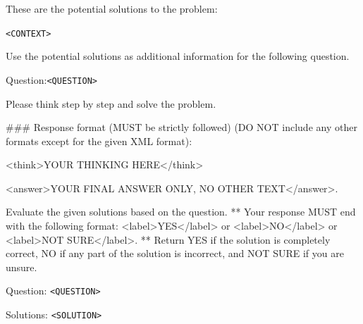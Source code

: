 \documentclass{article} %
\theoremstyle{plain}
\begin{document}


\begin{tcolorbox}[breakable,
  colback=gray!20!white,
  colframe=gray!80!black,
  title=Debate Prompt,
  fonttitle=\bfseries
]
These are the potential solutions to the problem:

\texttt{<CONTEXT>}

Use the potential solutions as additional information for the following question.

Question:\texttt{<QUESTION>}

Please think step by step and solve the problem.

\#\#\# Response format (MUST be strictly followed) (DO NOT include any other formats except for the given XML format): 

<think>YOUR THINKING HERE</think>

<answer>YOUR FINAL ANSWER ONLY, NO OTHER TEXT</answer>.
\end{tcolorbox}

\begin{tcolorbox}[breakable, 
  colback=gray!20!white,
  colframe=gray!80!black,
  title=Self-Evaluation Prompt,
  fonttitle=\bfseries
]
Evaluate the given solutions based on the question. ** Your response MUST end with the following format: <label>YES</label> or <label>NO</label> or <label>NOT SURE</label>. ** Return YES if the solution is completely correct, NO if any part of the solution is incorrect, and NOT SURE if you are unsure.


Question: \texttt{<QUESTION>}

Solutions: \texttt{<SOLUTION>}
\end{tcolorbox}
\end{document}
